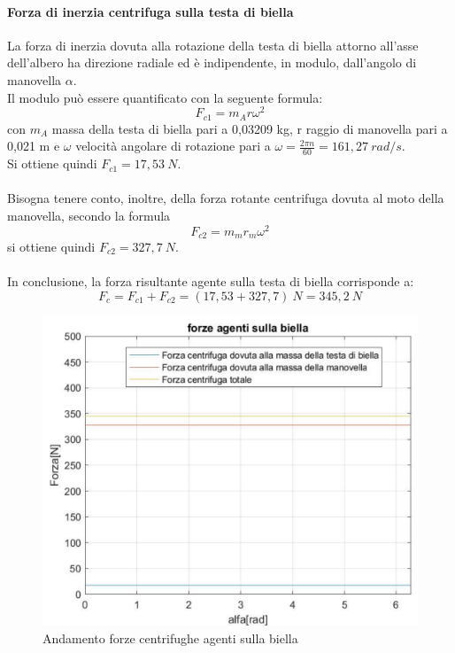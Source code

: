\paragraph{Forza di inerzia centrifuga sulla testa di biella}La forza di inerzia dovuta alla rotazione della testa di biella attorno all’asse dell’albero ha direzione radiale ed è indipendente, in modulo, dall’angolo di manovella $\alpha$.\\
Il modulo può essere quantificato con la seguente formula: 
\begin{equation}
    F_{c1}=m_Ar\omega^2
\end{equation}
con $m_A$ massa della testa di biella pari a 0,03209 kg, r raggio di manovella pari a 0,021 m e $\omega$ velocità angolare di rotazione pari a $\omega=\frac{2\pi n}{60}=161,27\ rad/s$.\\
Si ottiene quindi $F_{c1}=17,53\ N$.\\
\\
Bisogna tenere conto, inoltre, della forza rotante centrifuga dovuta al moto della manovella, secondo la formula 
\begin{equation}
    F_{c2}=m_mr_m\omega^2
\end{equation}
si ottiene quindi $F_{c2}=327,7\ N$.\\
\\
In conclusione, la forza risultante agente sulla testa di  biella corrisponde a:
\begin{equation}
    F_c=F_{c1}+F_{c2}=\left(17,53+327,7\right)\ N=345,2\ N
\end{equation}
\newpage
\begin{figure}[h]
    \centering
    \includegraphics[scale=0.5]{Immagini/GraficoForzeCentrifugheBiella.png}
    \caption{Andamento forze centrifughe agenti sulla biella}
    \label{fig:GraficoForzeCentrifugheBiella}
\end{figure}
